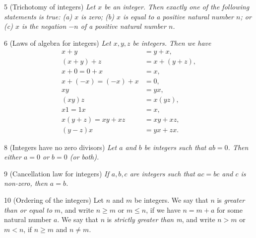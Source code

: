 \begin{lemma}{5}
    \label{int-trichotomy}
    (Trichotomy of integers) \emph{Let $x$ be an integer. Then exactly one of the following statements is true: (a)
    $x$ is zero; (b) $x$ is equal to a positive natural number $n$; or (c) $x$ is the negation $-n$ of a positive
    natural number $n$.}
\end{lemma}

\begin{proposition}{6}
    \label{int-algebra-laws}
    (Laws of algebra for integers) \emph{Let $x, y, z$ be integers. Then we have
    \begin{align*}
        x + y &= y + x,\\
        (x + y) + z &= x + (y + z),\\
        x + 0 = 0 + x &= x,\\
        x + (-x) = (-x) + x &= 0,\\
        xy &= yx,\\
        (xy)z &= x(yz),\\
        x1=1x &= x,\\
        x(y + z) = xy + xz &= xy + xz,\\
        (y - z)x &= yx + zx.
    \end{align*}
    }
\end{proposition}

\begin{proposition}{8}
    \label{int-no-zero-divisors}
    (Integers have no zero divisors) \emph{Let $a$ and $b$ be integers such that $ab = 0$. Then either $a = 0$ or
    $b = 0$ (or both).}
\end{proposition}

\begin{corollary}{9}
    \label{int-cancel}
    (Cancellation law for integers) \emph{If $a, b, c$ are integers such that $ac = bc$ and $c$ is non-zero, then
    $a = b$.}
\end{corollary}

\begin{definition}{10}
    \label{int-order}
    (Ordering of the integers) Let $n$ and $m$ be integers. We say that $n$ is \emph{greater than or equal to} $m$,
    and write $n \geq m$ or $m \leq n$, if we have $n = m + a$ for some natural number $a$. We say that $n$ is
    \emph{strictly greater than m}, and write $n > m$ or $m < n$, if $n \geq m$ and $n \neq m$.
\end{definition}


